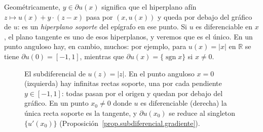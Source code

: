\documentclass[12pt, a4paper]{amsbook}
\newcommand{\figpanelsep}{6cm}   %
\newcommand{\R}{{\mathbb R}}
\theoremstyle{remark}
\theoremstyle{definition}
\numberwithin{section}{chapter}
\numberwithin{subsection}{section}
\numberwithin{equation}{section}
\numberwithin{figure}{chapter}
\begin{document}
Geométricamente, $y\in\partial u(x)$ significa que el hiperplano afín
$z\mapsto u(x)+y\cdot(z-x)$ pasa por $(x,u(x))$ y queda por debajo del gráfico
de $u$: es un \emph{hiperplano soporte} del epígrafo en ese punto. Si $u$ es
diferenciable en $x$, el plano tangente es uno de esos hiperplanos, y veremos
que es el único. En un punto anguloso hay, en cambio, muchos: por ejemplo,
para $u(x)=|x|$ en $\R$ se tiene $\partial u(0)=[-1,1]$, mientras que
$\partial u(x)=\{\operatorname{sgn}x\}$ si $x\neq0$.


\begin{figure}[ht]
\centering
{}
\caption{El subdiferencial de $u(z)=|z|$. En el punto anguloso $x=0$
(izquierda) hay infinitas rectas soporte, una por cada pendiente $y\in[-1,1]$:
todas pasan por el origen y quedan por debajo del gráfico. En un punto
$x_0\neq0$ donde $u$ es diferenciable (derecha) la única recta soporte es la
tangente, y $\partial u(x_0)$ se reduce al singleton $\{u'(x_0)\}$
(Proposición~\ref{prop.subdiferencial.gradiente}).}
\label{fig.subdiferencial}
\end{figure}
\end{document}
